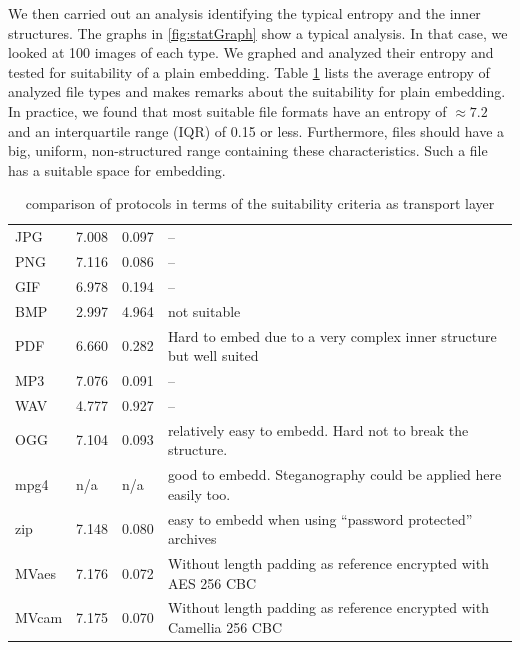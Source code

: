 We then carried out an analysis identifying the typical entropy and the inner structures. The graphs in \ref{fig:statGraph} show a typical analysis. In that case, we looked at 100 images of each type. We graphed and analyzed their entropy and tested for suitability of a plain embedding. Table \ref{tab:fileEntropy} lists the average entropy of analyzed file types and makes remarks about the suitability for plain embedding. In practice, we found that most suitable file formats have an entropy of $\approx 7.2$ and an interquartile range (IQR) of 0.15 or less. Furthermore, files should have a big, uniform, non-structured range containing these characteristics. Such a file has a suitable space for embedding.

\begin{table}[h]
	\centering\tiny
	\begin{tabular}{|l|l|l|l|}\hline
		\diaghead{\theadfont Type Criteria}{Type}{Criteria} & \thead{Avg. Entropy}     & \thead{IQR} & \thead{Remarks}\\\hline
		JPG       & 7.008  & 0.097 & -- \\              
		PNG       & 7.116  & 0.086 & -- \\              
		GIF       & 6.978  & 0.194 & -- \\              
		BMP       & 2.997  & 4.964 & not suitable \\              
		PDF       & 6.660  & 0.282 & Hard to embed due to a very complex inner structure but well suited \\\hline              
		MP3       & 7.076  & 0.091 & -- \\              
		WAV       & 4.777  & 0.927 & -- \\              
		OGG       & 7.104  & 0.093 & relatively easy to embedd. Hard not to break the structure. \\\hline              
		mpg4   & n/a    & n/a   & good to embedd. Steganography could be applied here easily too. \\\hline              
		zip    & 7.148    & 0.080 & easy to embedd when using ``password protected''  archives \\\hline\hline
		MVaes  & 7.176  & 0.072 & Without length padding as reference encrypted with AES 256 CBC\\
		MVcam  & 7.175  & 0.070 & Without length padding as reference encrypted with Camellia 256 CBC\\\hline
	\end{tabular}    
	\caption{comparison of protocols in terms of the suitability criteria as transport layer}
	\label{tab:fileEntropy}
\end{table}

